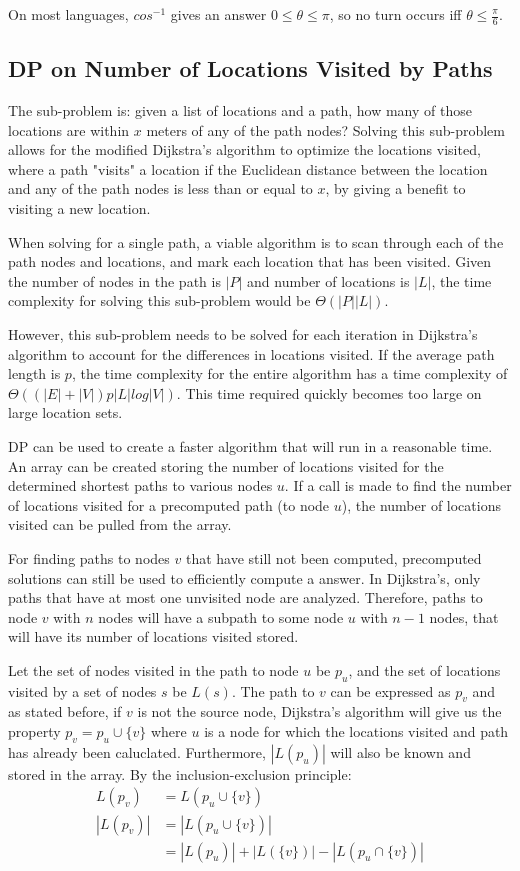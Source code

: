 \documentclass[letter,10pt]{article}
\begin{document}
On most languages, $cos^{-1}$ gives an answer $0 \leq \theta \leq \pi$, so no turn occurs iff $\theta \leq \frac{\pi}{6}$.

\subsection*{DP on Number of Locations Visited by Paths}
The sub-problem is: given a list of locations and a path, how many of those locations are within $x$ meters of any of the path nodes? Solving this sub-problem allows for the modified Dijkstra's algorithm to optimize the locations visited, where a path "visits" a location if the Euclidean distance between the location and any of the path nodes is less than or equal to $x$, by giving a benefit to visiting a new location.

When solving for a single path, a viable algorithm is to scan through each of the path nodes and locations, and mark each location that has been visited. Given the number of nodes in the path is $|P|$ and number of locations is $|L|$, the time complexity for solving this sub-problem would be $\Theta(|P||L|)$. 

However, this sub-problem needs to be solved for each iteration in Dijkstra's algorithm to account for the differences in locations visited. If the average path length is $p$, the time complexity for the entire algorithm has a time complexity of $\Theta ((|E|+|V|)p|L|log|V|)$. This time required quickly becomes too large on large location sets.

DP can be used to create a faster algorithm that will run in a reasonable time. An array can be created storing the number of locations visited for the determined shortest paths to various nodes $u$. If a call is made to find the number of locations visited for a precomputed path (to node $u$), the number of locations visited can be pulled from the array. 

For finding paths to nodes $v$ that have still not been computed, precomputed solutions can still be used to efficiently compute a answer. In Dijkstra's, only paths that have at most one unvisited node are analyzed. Therefore, paths to node $v$ with $n$ nodes will have a subpath to some node $u$ with $n-1$ nodes, that will have its number of locations visited stored. 

Let the set of nodes visited in the path to node $u$ be $p_u$, and the set of locations visited by a set of nodes $s$ be $L(s)$. The path to $v$ can be expressed as $p_v$ and as stated before, if $v$ is not the source node, Dijkstra's algorithm will give us the property $p_v = p_u \cup \{v\}$ where $u$ is a node for which the locations visited and path has already been caluclated. Furthermore, $|L(p_u)|$ will also be known and stored in the array. By the inclusion-exclusion principle:
\begin{align*}
    L(p_v) &= L(p_u \cup \{v\})\\
    |L(p_v)| &= |L(p_u \cup \{v\})|\\
    &= |L(p_u)| + |L(\{v\})| - |L(p_u \cap \{v\})|\\
\end{align*}
\end{document}
